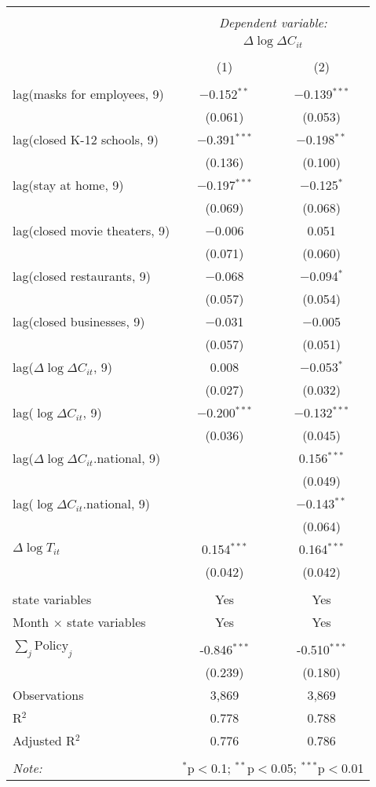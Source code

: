 \begin{tabular}{@{\extracolsep{1pt}}lcc} 
\\[-1.8ex]\hline 
\hline \\[-1.8ex] 
 & \multicolumn{2}{c}{\textit{Dependent variable:}} \\ 
\cline{2-3} 
 & \multicolumn{2}{c}{$\Delta \log \Delta C_{it}$} \\ 
\\[-1.8ex] & (1) & (2)\\ 
\hline \\[-1.8ex] 
 lag(masks for employees, 9) & $-$0.152$^{**}$ & $-$0.139$^{***}$ \\ 
  & (0.061) & (0.053) \\ 
  lag(closed K-12 schools, 9) & $-$0.391$^{***}$ & $-$0.198$^{**}$ \\ 
  & (0.136) & (0.100) \\ 
  lag(stay at home, 9) & $-$0.197$^{***}$ & $-$0.125$^{*}$ \\ 
  & (0.069) & (0.068) \\ 
  lag(closed movie theaters, 9) & $-$0.006 & 0.051 \\ 
  & (0.071) & (0.060) \\ 
  lag(closed restaurants, 9) & $-$0.068 & $-$0.094$^{*}$ \\ 
  & (0.057) & (0.054) \\ 
  lag(closed businesses, 9) & $-$0.031 & $-$0.005 \\ 
  & (0.057) & (0.051) \\ 
  lag($\Delta \log \Delta C_{it}$, 9) & 0.008 & $-$0.053$^{*}$ \\ 
  & (0.027) & (0.032) \\ 
  lag($\log \Delta C_{it}$, 9) & $-$0.200$^{***}$ & $-$0.132$^{***}$ \\ 
  & (0.036) & (0.045) \\ 
  lag($\Delta \log \Delta C_{it}$.national, 9) &  & 0.156$^{***}$ \\ 
  &  & (0.049) \\ 
  lag($\log \Delta C_{it}$.national, 9) &  & $-$0.143$^{**}$ \\ 
  &  & (0.064) \\ 
  $\Delta \log T_{it}$ & 0.154$^{***}$ & 0.164$^{***}$ \\ 
  & (0.042) & (0.042) \\ 
 \hline \\[-1.8ex] 
state variables & Yes & Yes \\ 
Month $\times$ state variables & Yes & Yes \\ 
\hline \\[-1.8ex] 
$\sum_j \mathrm{Policy}_j$ & -0.846$^{***}$ & -0.510$^{***}$ \\ 
 & (0.239) & (0.180) \\ 
Observations & 3,869 & 3,869 \\ 
R$^{2}$ & 0.778 & 0.788 \\ 
Adjusted R$^{2}$ & 0.776 & 0.786 \\ 
\hline 
\hline \\[-1.8ex] 
\textit{Note:}  & \multicolumn{2}{r}{$^{*}$p$<$0.1; $^{**}$p$<$0.05; $^{***}$p$<$0.01} \\ 
\end{tabular} 